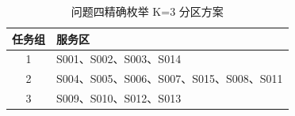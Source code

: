 \begin{table}[htbp]
\centering\small
\caption{问题四精确枚举 K=3 分区方案}\label{tab:q4_partition_k3}
\begin{tabular}{cl}
\toprule 任务组 & 服务区 \\\midrule
1 & S001、S002、S003、S014 \\
2 & S004、S005、S006、S007、S015、S008、S011 \\
3 & S009、S010、S012、S013 \\\bottomrule\end{tabular}\end{table}
